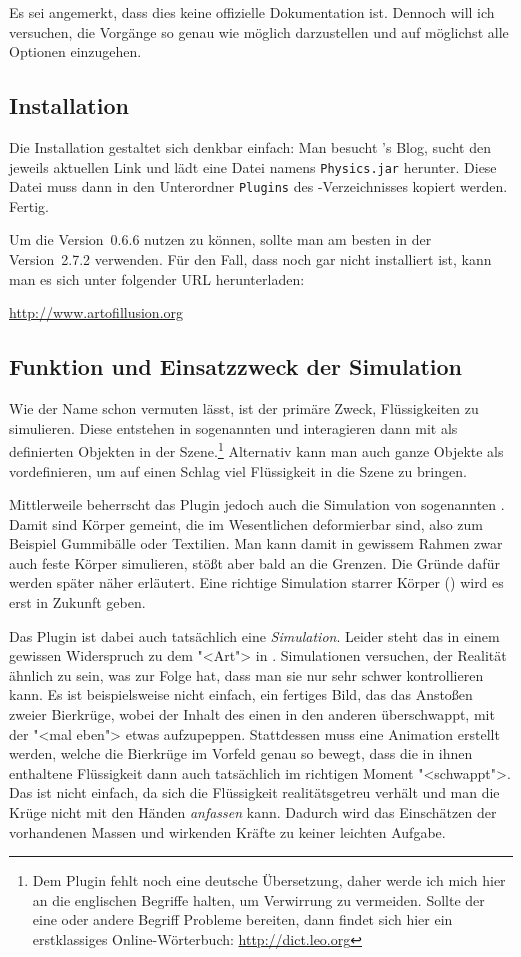 \documentclass[10pt,DIV=14,a4paper]{scrartcl}
\begin{document}
Es sei angemerkt, dass dies keine offizielle Dokumentation ist. Dennoch
will ich versuchen, die Vorgänge so genau wie möglich darzustellen und
auf möglichst alle Optionen einzugehen.

\subsection{Installation}
Die Installation gestaltet sich denkbar einfach: Man besucht \deltor's
Blog, sucht den jeweils aktuellen Link und lädt eine Datei namens
\texttt{Physics.jar} herunter. Diese Datei muss dann in den Unterordner
\texttt{Plugins} des \aoi-Verzeichnisses kopiert werden. Fertig.

Um die Version~0.6.6 nutzen zu können, sollte man am besten \aoi
in der Version~2.7.2 verwenden. Für den Fall, dass \aoi noch gar nicht
installiert ist, kann man es sich unter folgender URL herunterladen:

\url{http://www.artofillusion.org}

\subsection{Funktion und Einsatzzweck der Simulation}
Wie der Name schon vermuten lässt, ist der primäre Zweck, Flüssigkeiten
zu simulieren. Diese entstehen in sogenannten  und
interagieren dann mit als  definierten Objekten in der
Szene.\footnote{Dem Plugin fehlt noch eine deutsche Übersetzung, daher
werde ich mich hier an die englischen Begriffe halten, um Verwirrung zu
vermeiden. Sollte der eine oder andere Begriff Probleme bereiten, dann
findet sich hier ein erstklassiges Online-Wörterbuch:
\url{http://dict.leo.org}} Alternativ kann man auch ganze Objekte
als  vordefinieren, um auf einen Schlag viel Flüssigkeit in die
Szene zu bringen.

Mittlerweile beherrscht das Plugin jedoch auch die Simulation von
sogenannten . Damit sind Körper gemeint, die im
Wesentlichen deformierbar sind, also zum Beispiel Gummibälle oder
Textilien. Man kann damit in gewissem Rahmen zwar auch feste Körper
simulieren, stößt aber bald an die Grenzen. Die Gründe dafür werden
später näher erläutert. Eine richtige Simulation starrer Körper
() wird es erst in Zukunft geben.

Das Plugin ist dabei auch tatsächlich eine \emph{Simulation}. Leider
steht das in einem gewissen Widerspruch zu dem "<Art"> in \aoi.
Simulationen versuchen, der Realität ähnlich zu sein, was zur Folge hat,
dass man sie nur sehr schwer kontrollieren kann. Es ist beispielsweise
nicht einfach, ein fertiges Bild, das das Anstoßen zweier Bierkrüge,
wobei der Inhalt des einen in den anderen überschwappt, mit der
\fluidsim "<mal eben"> etwas aufzupeppen. Stattdessen muss eine
Animation erstellt werden, welche die Bierkrüge im Vorfeld genau so
bewegt, dass die in ihnen enthaltene Flüssigkeit dann auch tatsächlich
im richtigen Moment "<schwappt">.  Das ist nicht einfach, da sich die
Flüssigkeit realitätsgetreu verhält und man die Krüge nicht mit den
Händen \emph{anfassen} kann. Dadurch wird das Einschätzen der
vorhandenen Massen und wirkenden Kräfte zu keiner leichten Aufgabe.
\end{document}
